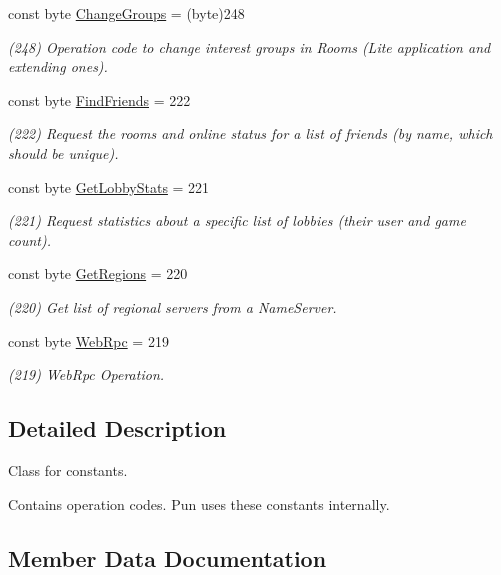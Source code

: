 \begin{DoxyCompactItemize}
const byte \hyperlink{class_exit_games_1_1_client_1_1_photon_1_1_operation_code_ab92f32ca36b9c62c35e2e32c067e6158}{Change\+Groups} = (byte)248
\begin{DoxyCompactList}\small\item\em (248) Operation code to change interest groups in Rooms (Lite application and extending ones).\end{DoxyCompactList}\item 
const byte \hyperlink{class_exit_games_1_1_client_1_1_photon_1_1_operation_code_a798a8291fd87aa865d470cd1f09f05b5}{Find\+Friends} = 222
\begin{DoxyCompactList}\small\item\em (222) Request the rooms and online status for a list of friends (by name, which should be unique).\end{DoxyCompactList}\item 
const byte \hyperlink{class_exit_games_1_1_client_1_1_photon_1_1_operation_code_ab495c557979c0d0bae83444712ce8acc}{Get\+Lobby\+Stats} = 221
\begin{DoxyCompactList}\small\item\em (221) Request statistics about a specific list of lobbies (their user and game count).\end{DoxyCompactList}\item 
const byte \hyperlink{class_exit_games_1_1_client_1_1_photon_1_1_operation_code_a47ec5b6ce3097f6c31a440d679a39bd5}{Get\+Regions} = 220
\begin{DoxyCompactList}\small\item\em (220) Get list of regional servers from a Name\+Server.\end{DoxyCompactList}\item 
const byte \hyperlink{class_exit_games_1_1_client_1_1_photon_1_1_operation_code_af3a967de533671c1a5b04c698c19c84b}{Web\+Rpc} = 219
\begin{DoxyCompactList}\small\item\em (219) Web\+Rpc Operation.\end{DoxyCompactList}\end{DoxyCompactItemize}


\subsection{Detailed Description}
Class for constants. 

Contains operation codes. Pun uses these constants internally. 

\subsection{Member Data Documentation}

